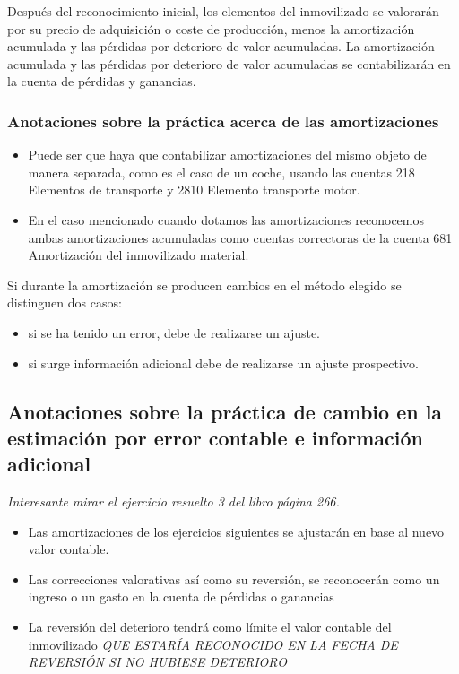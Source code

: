 \documentclass[a4paper,12pt]{article}
\begin{document}
\begin{tcolorbox}[colback=yellow!20!white, colframe=yellow!80!black, title=Nota]
    Después del reconocimiento inicial, los elementos del inmovilizado se valorarán por su precio de adquisición o coste de producción, menos la amortización acumulada y las pérdidas por deterioro de valor acumuladas. La amortización acumulada y las pérdidas por deterioro de valor acumuladas se contabilizarán en la cuenta de pérdidas y ganancias.
\end{tcolorbox}
\newpage
\subsubsection*{Anotaciones sobre la práctica acerca de las amortizaciones}
\begin{itemize}
    \item Puede ser que haya que contabilizar amortizaciones del mismo objeto de manera separada, como es el caso de un coche, usando las cuentas 218 Elementos de transporte y 2810 Elemento transporte motor.
    \item En el caso mencionado cuando dotamos las amortizaciones reconocemos ambas amortizaciones acumuladas como cuentas correctoras de la cuenta 681 Amortización del inmovilizado material.
\end{itemize}

Si durante la amortización se producen cambios en el método elegido se distinguen dos casos:
\begin{itemize}
    \item si se ha tenido un error, debe de realizarse un ajuste.
    \item si surge información adicional debe de realizarse un ajuste prospectivo.
\end{itemize}

\subsection*{Anotaciones sobre la práctica de cambio en la estimación por error contable e información adicional}
\textit{Interesante mirar el ejercicio resuelto 3 del libro página 266.}

\begin{itemize}
    \item Las amortizaciones de los ejercicios siguientes se ajustarán en base al nuevo valor contable.
    \item Las correcciones valorativas así como su reversión, se reconocerán como un ingreso o un gasto en la cuenta de pérdidas o ganancias
    \item La reversión del deterioro tendrá como límite el valor contable del inmovilizado \textit{QUE ESTARÍA RECONOCIDO EN LA FECHA DE REVERSIÓN SI NO HUBIESE DETERIORO}
\end{itemize}
\end{document}
